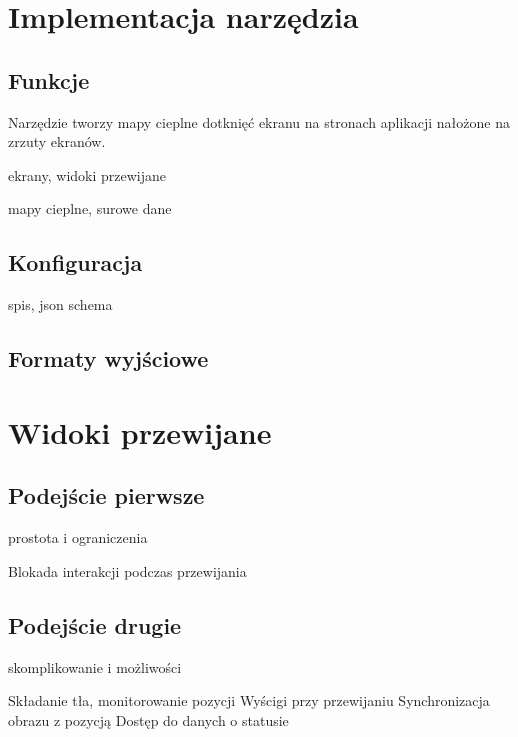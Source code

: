 \section{Implementacja narzędzia}

\subsection{Funkcje}

Narzędzie tworzy mapy cieplne dotknięć ekranu na stronach aplikacji nałożone na zrzuty ekranów. 

ekrany, widoki przewijane

mapy cieplne, surowe dane

\subsection{Konfiguracja}
spis, json schema

\subsection{Formaty wyjściowe}

\section{Widoki przewijane}

\subsection{Podejście pierwsze}
prostota i ograniczenia

Blokada interakcji podczas przewijania

\subsection{Podejście drugie}
skomplikowanie i możliwości

Składanie tła, monitorowanie pozycji
Wyścigi przy przewijaniu
Synchronizacja obrazu z pozycją
Dostęp do danych o statusie
